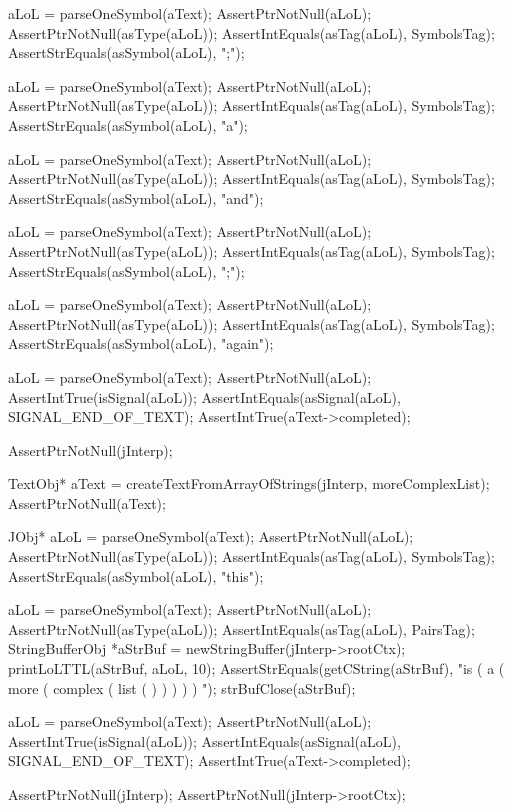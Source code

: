   aLoL = parseOneSymbol(aText);
  AssertPtrNotNull(aLoL);
  AssertPtrNotNull(asType(aLoL));
  AssertIntEquals(asTag(aLoL), SymbolsTag);
  AssertStrEquals(asSymbol(aLoL), ";");

  aLoL = parseOneSymbol(aText);
  AssertPtrNotNull(aLoL);
  AssertPtrNotNull(asType(aLoL));
  AssertIntEquals(asTag(aLoL), SymbolsTag);
  AssertStrEquals(asSymbol(aLoL), "a");

  aLoL = parseOneSymbol(aText);
  AssertPtrNotNull(aLoL);
  AssertPtrNotNull(asType(aLoL));
  AssertIntEquals(asTag(aLoL), SymbolsTag);
  AssertStrEquals(asSymbol(aLoL), "and");

  aLoL = parseOneSymbol(aText);
  AssertPtrNotNull(aLoL);
  AssertPtrNotNull(asType(aLoL));
  AssertIntEquals(asTag(aLoL), SymbolsTag);
  AssertStrEquals(asSymbol(aLoL), ";");

  aLoL = parseOneSymbol(aText);
  AssertPtrNotNull(aLoL);
  AssertPtrNotNull(asType(aLoL));
  AssertIntEquals(asTag(aLoL), SymbolsTag);
  AssertStrEquals(asSymbol(aLoL), "again");

  aLoL = parseOneSymbol(aText);
  AssertPtrNotNull(aLoL);
  AssertIntTrue(isSignal(aLoL));
  AssertIntEquals(asSignal(aLoL), SIGNAL_END_OF_TEXT);
  AssertIntTrue(aText->completed);
\stopCTest
\stopTestCase

\startCTest
  AssertPtrNotNull(jInterp);

  TextObj* aText = createTextFromArrayOfStrings(jInterp, moreComplexList);
  AssertPtrNotNull(aText);

  JObj* aLoL = parseOneSymbol(aText);
  AssertPtrNotNull(aLoL);
  AssertPtrNotNull(asType(aLoL));
  AssertIntEquals(asTag(aLoL), SymbolsTag);
  AssertStrEquals(asSymbol(aLoL), "this");

  aLoL = parseOneSymbol(aText);
  AssertPtrNotNull(aLoL);
  AssertPtrNotNull(asType(aLoL));
  AssertIntEquals(asTag(aLoL), PairsTag);
  StringBufferObj *aStrBuf = newStringBuffer(jInterp->rootCtx);
  printLoLTTL(aStrBuf, aLoL, 10);
  AssertStrEquals(getCString(aStrBuf),
    "is ( a ( more ( complex ( list ( ) ) ) ) ) ");
  strBufClose(aStrBuf);

  aLoL = parseOneSymbol(aText);
  AssertPtrNotNull(aLoL);
  AssertIntTrue(isSignal(aLoL));
  AssertIntEquals(asSignal(aLoL), SIGNAL_END_OF_TEXT);
  AssertIntTrue(aText->completed);
\stopCTest
\stopTestCase

\startCTest
  AssertPtrNotNull(jInterp);
  AssertPtrNotNull(jInterp->rootCtx);
  
